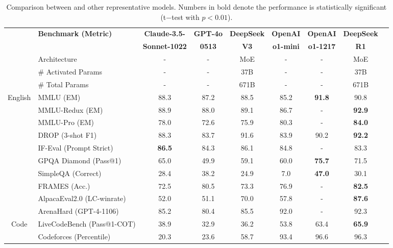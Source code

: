 \begin{table}[h]
    \centering
    \footnotesize
    \setlength{\tabcolsep}{1.9pt}
    \caption{ Comparison between \dsri{} and other representative models.  Numbers in bold denote the performance is statistically significant  (t$-$test with $p < 0.01$).
    }
    \begin{tabular}{@{}c l | c  c  c | c c |c c @{}}
    \toprule
    & \multirow{2}{*}{\centering \textbf{Benchmark {\tiny (Metric)}}}  & \textbf{Claude-3.5-}  & \textbf{GPT-4o}& \textbf{DeepSeek} & \textbf{OpenAI} & \textbf{OpenAI} & \textbf{DeepSeek} \\
    & & \textbf{Sonnet-1022}  & \textbf{0513} & \textbf{V3} & \textbf{o1-mini}& \textbf{o1-1217} &\textbf{R1} \\
    \midrule
    & Architecture &-&- & MoE &-&-& MoE \\
    & \# Activated Params& -&-& 37B&-&- & 37B \\
    & \# Total Params &-&-& 671B&-&- & 671B \\
    \midrule
    \multirow{10}{*}{English}& MMLU {\tiny (EM)} & 88.3&87.2 & 88.5 & 85.2 & \textbf{91.8} & 90.8\\
     & MMLU-Redux {\tiny (EM)}& 88.9& 88.0 & 89.1 & 86.7&- & \textbf{92.9} \\
    & MMLU-Pro {\tiny (EM)}  & 78.0 & 72.6 & 75.9 & 80.3 &-& \textbf{84.0} \\
    & DROP {\tiny (3-shot F1)}  & 88.3 & 83.7 & 91.6 & 83.9 & 90.2 & \textbf{92.2} \\
    & IF-Eval {\tiny (Prompt Strict)}  & \textbf{86.5} & 84.3 & 86.1 & 84.8&- & 83.3 \\
    & GPQA Diamond {\tiny (Pass@1)}& 65.0 & 49.9 & 59.1 & 60.0 & \textbf{75.7} & 71.5 \\
    & SimpleQA {\tiny (Correct)} & 28.4 & 38.2& 24.9 & 7.0 & \textbf{47.0} & 30.1\\
     & FRAMES {\tiny (Acc.)}  & 72.5 & 80.5 & 73.3 & 76.9 & -&\textbf{82.5}  \\
      & AlpacaEval2.0 {\tiny (LC-winrate)}  & 52.0 &  51.1 & 70.0 & 57.8 & - & \textbf{87.6}\\
       & ArenaHard {\tiny (GPT-4-1106)}  & 85.2 & 80.4 & 85.5 & 92.0 & - & 92.3\\
    \midrule
    \multirow{4}{*}{Code} & LiveCodeBench {\tiny (Pass@1-COT)} & 38.9 & 32.9 & 36.2 & 53.8 & 63.4 & \textbf{65.9} \\
    & Codeforces {\tiny (Percentile)}& 20.3 & 23.6 & 58.7 & 93.4 & 96.6 & 96.3 \\

\end{tabular}
\end{table}
